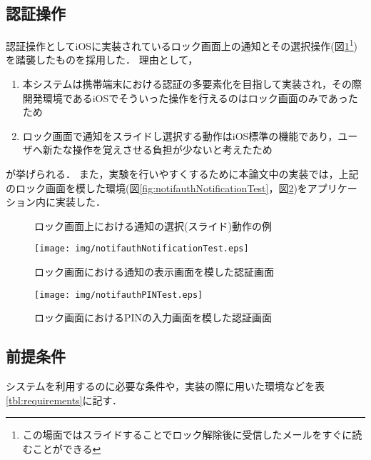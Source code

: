 \subsection{認証操作}
認証操作としてiOSに実装されているロック画面上の通知とその選択操作(図\ref{fig:notificationSliding}\footnote{この場面ではスライドすることでロック解除後に受信したメールをすぐに読むことができる})を踏襲したものを採用した．
理由として，
\begin{enumerate}
  \item 本システムは携帯端末における認証の多要素化を目指して実装され，その際開発環境であるiOSでそういった操作を行えるのはロック画面のみであったため
  \item ロック画面で通知をスライドし選択する動作はiOS標準の機能であり，ユーザへ新たな操作を覚えさせる負担が少ないと考えたため
\end{enumerate}
が挙げられる．
また，実験を行いやすくするために本論文中の実装では，上記のロック画面を模した環境(図\ref{fig:notifauthNotificationTest}，図\ref{fig:notifauthPINTest})をアプリケーション内に実装した．

\begin{figure}[ht]
  \begin{center}
  \end{center}
  \caption{ロック画面上における通知の選択(スライド)動作の例}
  \label{fig:notificationSliding}
\end{figure}

\begin{figure}[ht]
  \begin{minipage}{0.5\hsize}
    \begin{center}
      \texttt{[image: img/notifauthNotificationTest.eps]}
    \end{center}
    \caption{ロック画面における通知の表示画面を模した認証画面}
    \label{fig:notifauthNotificationTest}
  \end{minipage}
  \begin{minipage}{0.5\hsize}
    \begin{center}
      \texttt{[image: img/notifauthPINTest.eps]}
    \end{center}
    \caption{ロック画面におけるPINの入力画面を模した認証画面}
    \label{fig:notifauthPINTest}
  \end{minipage}
\end{figure}

\subsection{前提条件}
システムを利用するのに必要な条件や，実装の際に用いた環境などを表\ref{tbl:requirements}に記す．

